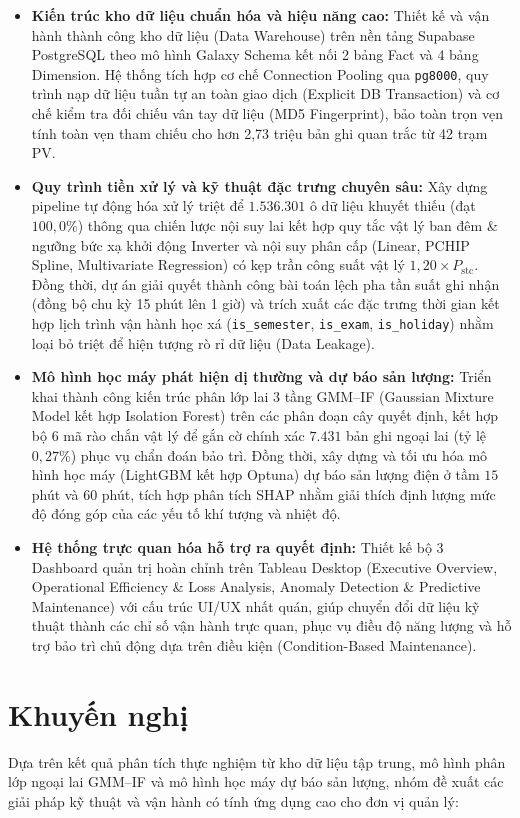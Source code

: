 \documentclass[12pt, a4paper]{report}
\begin{document}
\begin{itemize}
    \item \textbf{Kiến trúc kho dữ liệu chuẩn hóa và hiệu năng cao:} Thiết kế và vận hành thành công kho dữ liệu (Data Warehouse) trên nền tảng Supabase PostgreSQL theo mô hình Galaxy Schema kết nối 2 bảng Fact và 4 bảng Dimension. Hệ thống tích hợp cơ chế Connection Pooling qua \texttt{pg8000}, quy trình nạp dữ liệu tuần tự an toàn giao dịch (Explicit DB Transaction) và cơ chế kiểm tra đối chiếu vân tay dữ liệu (MD5 Fingerprint), bảo toàn trọn vẹn tính toàn vẹn tham chiếu cho hơn 2,73 triệu bản ghi quan trắc từ 42 trạm PV.
    \item \textbf{Quy trình tiền xử lý và kỹ thuật đặc trưng chuyên sâu:} Xây dựng pipeline tự động hóa xử lý triệt để $1.536.301$ ô dữ liệu khuyết thiếu (đạt $100{,}0\%$) thông qua chiến lược nội suy lai kết hợp quy tắc vật lý ban đêm \& ngưỡng bức xạ khởi động Inverter và nội suy phân cấp (Linear, PCHIP Spline, Multivariate Regression) có kẹp trần công suất vật lý $1{,}20\times P_{\text{stc}}$. Đồng thời, dự án giải quyết thành công bài toán lệch pha tần suất ghi nhận (đồng bộ chu kỳ 15 phút lên 1 giờ) và trích xuất các đặc trưng thời gian kết hợp lịch trình vận hành học xá (\texttt{is\_semester}, \texttt{is\_exam}, \texttt{is\_holiday}) nhằm loại bỏ triệt để hiện tượng rò rỉ dữ liệu (Data Leakage).
    \item \textbf{Mô hình học máy phát hiện dị thường và dự báo sản lượng:} Triển khai thành công kiến trúc phân lớp lai 3 tầng GMM--IF (Gaussian Mixture Model kết hợp Isolation Forest) trên các phân đoạn cây quyết định, kết hợp bộ 6 mã rào chắn vật lý để gắn cờ chính xác $7.431$ bản ghi ngoại lai (tỷ lệ $0{,}27\%$) phục vụ chẩn đoán bảo trì. Đồng thời, xây dựng và tối ưu hóa mô hình học máy (LightGBM kết hợp Optuna) dự báo sản lượng điện ở tầm $15$ phút và $60$ phút, tích hợp phân tích SHAP nhằm giải thích định lượng mức độ đóng góp của các yếu tố khí tượng và nhiệt độ.
    \item \textbf{Hệ thống trực quan hóa hỗ trợ ra quyết định:} Thiết kế bộ 3 Dashboard quản trị hoàn chỉnh trên Tableau Desktop (Executive Overview, Operational Efficiency \& Loss Analysis, Anomaly Detection \& Predictive Maintenance) với cấu trúc UI/UX nhất quán, giúp chuyển đổi dữ liệu kỹ thuật thành các chỉ số vận hành trực quan, phục vụ điều độ năng lượng và hỗ trợ bảo trì chủ động dựa trên điều kiện (Condition-Based Maintenance).
\end{itemize}

\section{Khuyến nghị}
\label{sec:recommendations}
Dựa trên kết quả phân tích thực nghiệm từ kho dữ liệu tập trung, mô hình phân lớp ngoại lai GMM--IF và mô hình học máy dự báo sản lượng, nhóm đề xuất các giải pháp kỹ thuật và vận hành có tính ứng dụng cao cho đơn vị quản lý:
\end{document}
